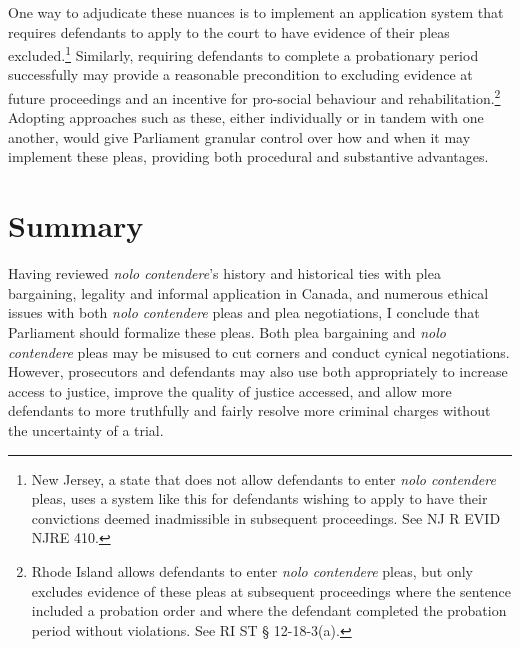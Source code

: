 One way to adjudicate these nuances is to implement an application system that requires defendants to apply to the court to have evidence of their pleas excluded.\footnote{New Jersey, a state that does not allow defendants to enter \textit{nolo contendere} pleas, uses a system like this for defendants wishing to apply to have their convictions deemed inadmissible in subsequent proceedings. See NJ R EVID NJRE 410.} Similarly, requiring defendants to complete a probationary period successfully may provide a reasonable precondition to excluding evidence at future proceedings and an incentive for pro-social behaviour and rehabilitation.\footnote{Rhode Island allows defendants to enter \textit{nolo contendere} pleas, but only excludes evidence of these pleas at subsequent proceedings where the sentence included a probation order and where the defendant completed the probation period without violations. See RI ST § 12-18-3(a).} Adopting approaches such as these, either individually or in tandem with one another, would give Parliament granular control over how and when it may implement these pleas, providing both procedural and substantive advantages.

\section{Summary}

Having reviewed \textit{nolo contendere}'s history and historical ties with plea bargaining, legality and informal application in Canada, and numerous ethical issues with both \textit{nolo contendere} pleas and plea negotiations, I conclude that Parliament should formalize these pleas. Both plea bargaining and \textit{nolo contendere} pleas may be misused to cut corners and conduct cynical negotiations. However, prosecutors and defendants may also use both appropriately to increase access to justice, improve the quality of justice accessed, and allow more defendants to more truthfully and fairly resolve more criminal charges without the uncertainty of a trial. 